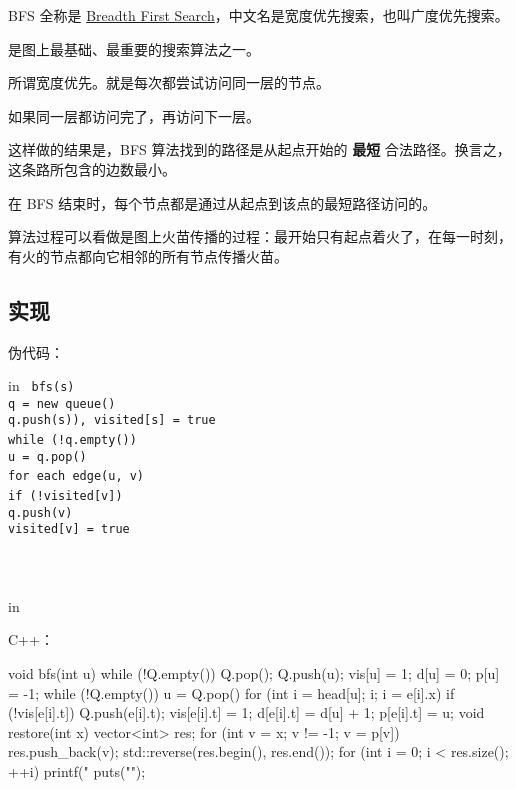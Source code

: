 
BFS 全称是 \href{https://en.wikipedia.org/wiki/Breadth-first_search}{Breadth First Search}，中文名是宽度优先搜索，也叫广度优先搜索。

是图上最基础、最重要的搜索算法之一。

所谓宽度优先。就是每次都尝试访问同一层的节点。

如果同一层都访问完了，再访问下一层。

这样做的结果是，BFS 算法找到的路径是从起点开始的 \textbf{ 最短 } 合法路径。换言之，这条路所包含的边数最小。

在 BFS 结束时，每个节点都是通过从起点到该点的最短路径访问的。

算法过程可以看做是图上火苗传播的过程：最开始只有起点着火了，在每一时刻，有火的节点都向它相邻的所有节点传播火苗。

\subsection{实现}

伪代码：

 in
\texttt{
bfs(s) {\\  q = new queue()\\  q.push(s)), visited[s] = true\\  while (!q.empty()) {\\    u = q.pop()\\    for each edge(u, v) {\\      if (!visited[v]) {\\        q.push(v)\\        visited[v] = true\\      }\\    }\\  }\\}}
 in

C++：

\begin{cppcode}
void bfs(int u) {
  while (!Q.empty()) Q.pop();
  Q.push(u);
  vis[u] = 1;
  d[u] = 0;
  p[u] = -1;
  while (!Q.empty()) {
    u = Q.pop() {
      for (int i = head[u]; i; i = e[i].x) {
        if (!vis[e[i].t]) {
          Q.push(e[i].t);
          vis[e[i].t] = 1;
          d[e[i].t] = d[u] + 1;
          p[e[i].t] = u;
        }
      }
    }
  }
}
void restore(int x) {
  vector<int> res;
  for (int v = x; v != -1; v = p[v]) {
    res.push_back(v);
  }
  std::reverse(res.begin(), res.end());
  for (int i = 0; i < res.size(); ++i) printf("%
  puts("");
}
\end{cppcode}

